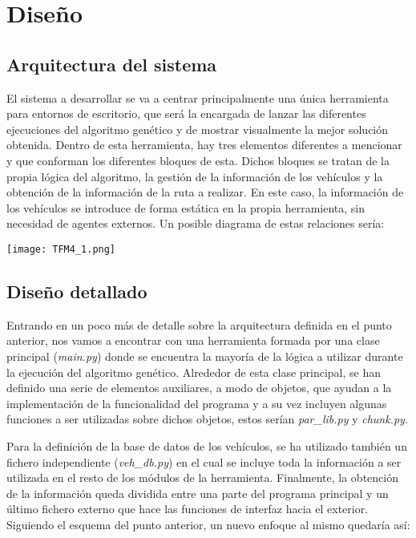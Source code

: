 \documentclass[11pt,spanish,listoffigures,listoftables]{tfgetsinf}
\begin{document}
\chapter{Diseño}
\section{Arquitectura del sistema}
El sistema a desarrollar se va a centrar principalmente una única herramienta para entornos de escritorio, que será la encargada de lanzar las diferentes ejecuciones del algoritmo genético y de mostrar visualmente la mejor solución obtenida. Dentro de esta herramienta, hay tres elementos diferentes a mencionar y que conforman los diferentes bloques de esta. Dichos bloques se tratan de la propia lógica del algoritmo, la gestión de la información de los vehículos y la obtención de la información de la ruta a realizar. En este caso, la información de los vehículos se introduce de forma estática en la propia herramienta, sin necesidad de agentes externos. Un posible diagrama de estas relaciones sería:

\begin{center}
\texttt{[image: TFM4\_1.png]}    
\end{center}

\section{Diseño detallado}
Entrando en un poco más de detalle sobre la arquitectura definida en el punto anterior, nos vamos a encontrar con una herramienta formada por una clase principal (\textit{main.py}) donde se encuentra la mayoría de la lógica a utilizar durante la ejecución del algoritmo genético. Alrededor de esta clase principal, se han definido una serie de elementos auxiliares, a modo de objetos, que ayudan a la implementación de la funcionalidad del programa y a su vez incluyen algunas funciones a ser utilizadas sobre dichos objetos, estos serían \textit{par\_lib.py} y \textit{chunk.py}.

Para la definición de la base de datos de los vehículos, se ha utilizado también un fichero independiente (\textit{veh\_db.py}) en el cual se incluye toda la información a ser utilizada en el resto de los módulos de la herramienta. Finalmente, la obtención de la información queda dividida entre una parte del programa principal y un último fichero externo que hace las funciones de interfaz hacia el exterior. Siguiendo el esquema del punto anterior, un nuevo enfoque al mismo quedaría así:
\end{document}
